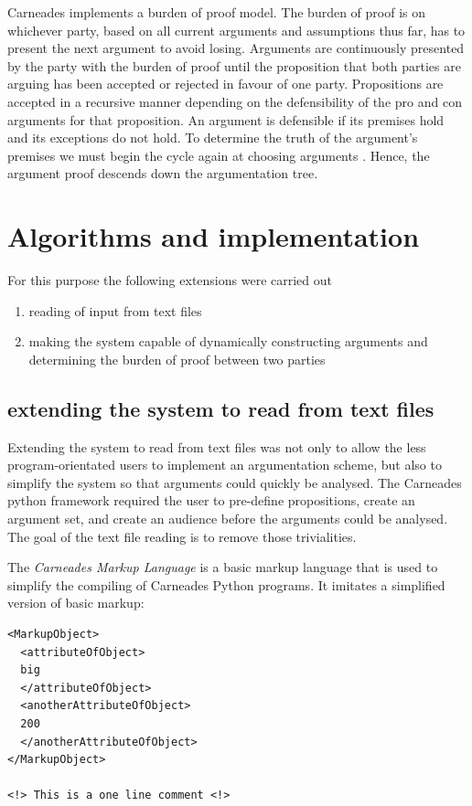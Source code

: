 \documentclass[10pt,a4paper,twocolumn]{article}
\begin{document}
Carneades implements a burden of proof model. The burden of proof is on
whichever party, based on all current arguments and assumptions thus far, has to present the
next argument to avoid losing. Arguments are continuously presented by the party with the
burden of proof until the proposition that both parties are arguing has been
accepted or rejected in favour of one party. Propositions are accepted in
a recursive manner depending on the defensibility of the pro and con arguments
for that proposition.
An argument is defensible if its premises hold and its exceptions do not hold.
To determine the truth of the argument's premises we must begin the cycle again at choosing
arguments \cite{ES4}. Hence, the
argument proof descends down the argumentation tree.

\section{Algorithms and implementation}

For this purpose the following extensions were carried out
\begin{enumerate}
\item reading of input from text files
\item making the system capable of dynamically constructing arguments and
	determining the burden of proof between two
	parties
\end{enumerate}

\subsection{extending the system to read from text files}

Extending the system to read from text files was not only to allow the less
program-orientated users to implement an argumentation scheme, but also to
simplify the system so that arguments could quickly be analysed. The Carneades
python framework required the user to pre-define propositions, create an
argument set, and create an audience before the arguments could be analysed. The
goal of the text file reading is to remove those trivialities.

The \textit{Carneades Markup Language} is a basic markup language that is used 
to simplify the compiling of Carneades Python programs. It imitates a 
simplified version of basic markup:

\begin{lstlisting}
<MarkupObject>
  <attributeOfObject>
  big
  </attributeOfObject>
  <anotherAttributeOfObject>
  200
  </anotherAttributeOfObject>
</MarkupObject>

<!> This is a one line comment <!>
\end{lstlisting}
\end{document}

